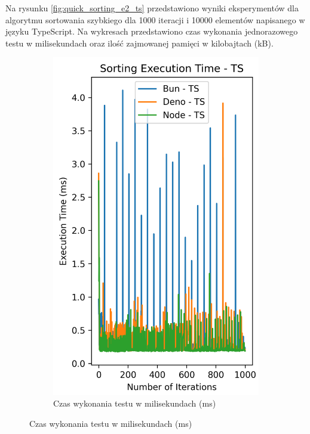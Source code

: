Na rysunku \ref{fig:quick_sorting_e2_ts} przedstawiono wyniki eksperymentów dla algorytmu sortowania szybkiego dla 1000 iteracji i 10000 elementów napisanego w języku TypeScript. Na wykresach przedstawiono czas wykonania jednorazowego testu w milisekundach oraz ilość zajmowanej pamięci w kilobajtach (kB).

\begin{figure}[H]
  \centering
  \begin{subfigure}[b]{0.42\textwidth}
    \centering
    \includegraphics[width=\textwidth]{Figures/sorting/sorting_quick_1000_1000_ts_time.png}
    \caption{Czas wykonania testu w milisekundach (ms)}

\end{subfigure}
\end{figure}

